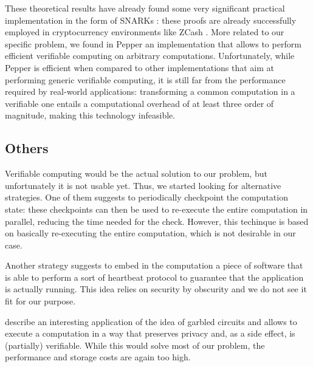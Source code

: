 These theoretical results have already found some very significant practical implementation in the form of SNARKs \cite{snarks}: these proofs are already successfully employed in cryptocurrency environments like ZCash \cite{zerocash}. More related to our specific problem, we found in Pepper \cite{pepper-website} an implementation that allows to perform efficient verifiable computing on arbitrary computations.
Unfortunately, while Pepper is efficient when compared to other implementations that aim at performing generic verifiable computing, it is still far from the performance required by real-world applications: transforming a common computation in a verifiable one entails a computational overhead of at least three order of magnitude, making this technology infeasible.

\subsection{Others}
Verifiable computing would be the actual solution to our problem, but unfortunately it is not usable yet. Thus, we started looking for alternative strategies. One of them \cite{verifying-computation-by-checkpoints} suggests to periodically checkpoint the computation state: these checkpoints can then be used to re-execute the entire computation in parallel, reducing the time needed for the check. However, this techinque is based on basically re-executing the entire computation, which is not desirable in our case. 

Another strategy \cite{integrity-checking-remote-computation} suggests to embed in the computation a piece of software that is able to perform a sort of heartbeat protocol to guarantee that the application is actually running. This idea relies on security by obscurity and we do not see it fit for our purpose.

\citet{verifiable-cloud-computing-for-mobile} describe an interesting application of the idea of garbled circuits and allows to execute a computation in a way that preserves privacy and, as a side effect, is (partially) verifiable. While this would solve most of our problem, the performance and storage costs are again too high.
